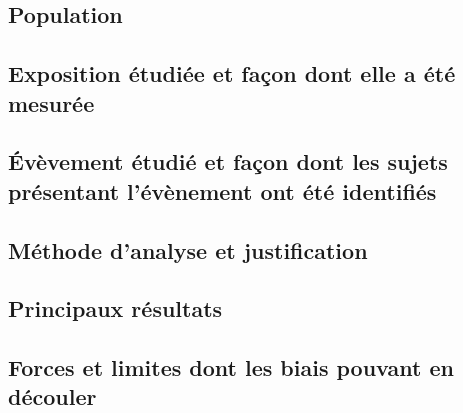\documentclass[10pt]{article}
\begin{document}
\subsection{Population}

\subsection{Exposition étudiée et façon dont elle a été mesurée}

\subsection{\'{E}vèvement étudié et façon dont les sujets présentant l'évènement ont été identifiés}

\subsection{Méthode d'analyse et justification}

\subsection{Principaux résultats}

\subsection{Forces et limites dont les biais pouvant en découler}
\end{document}
